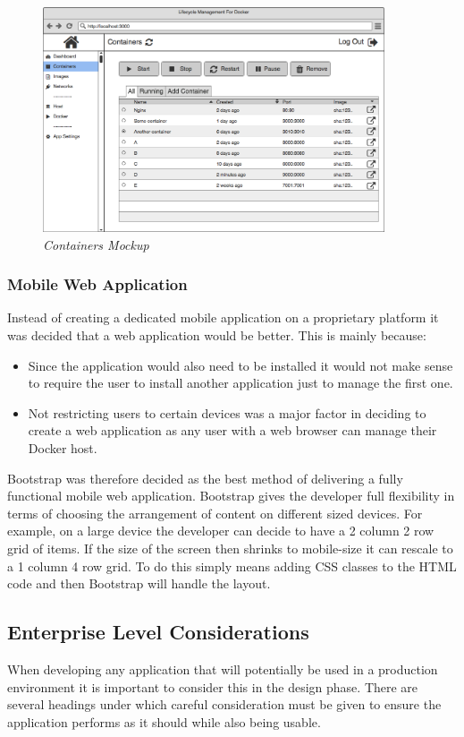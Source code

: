 \begin{figure}[!ht]
\centering
\includegraphics*[width=0.9\textwidth]{wireframes/containers}
\caption{\em Containers Mockup}
\label{fig:containers_wireframe}
\end{figure}

\subsubsection{Mobile Web Application}
Instead of creating a dedicated mobile application on a proprietary platform it was decided that a web application would be better. This is mainly because:

\begin{itemize}
	\item Since the application would also need to be installed it would not make sense to require the user to install another application just to manage the first one.
	\item Not restricting users to certain devices was a major factor in deciding to create a web application as any user with a web browser can manage their \gls{Docker host}.
\end{itemize} 

\gls{Bootstrap} was therefore decided as the best method of delivering a fully functional mobile web application. Bootstrap gives the developer full flexibility in terms of choosing the arrangement of content on different sized devices. For example, on a large device the developer can decide to have a 2 column 2 row grid of items. If the size of the screen then shrinks to mobile-size it can rescale to a 1 column 4 row grid. To do this simply means adding \gls{CSS} classes to the \gls{HTML} code and then Bootstrap will handle the layout.

\subsection{Enterprise Level Considerations}
When developing any application that will potentially be used in a production environment it is important to consider this in the design phase. There are several headings under which careful consideration must be given to ensure the application performs as it should while also being usable.

